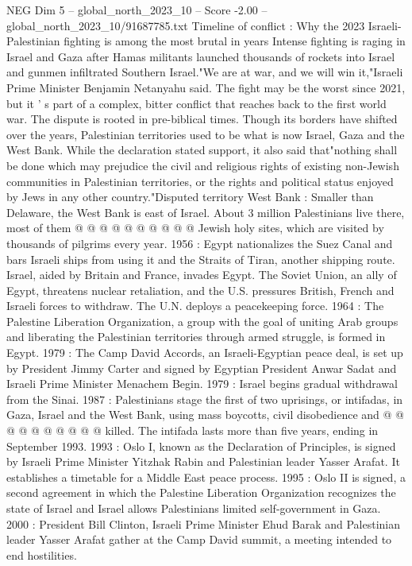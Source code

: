 \begin{textsample}{NEG Dim 5 – global\_north\_2023\_10 – Score -2.00 – global\_north\_2023\_10/91687785.txt}  \label{ex:f5_neg_021}
Timeline of conflict : Why the 2023 Israeli-Palestinian fighting is among the most brutal in years Intense fighting is raging in Israel and Gaza after Hamas militants launched thousands of rockets into Israel and gunmen infiltrated Southern Israel."We are at war, and we will win it,"Israeli Prime Minister Benjamin Netanyahu said.
The fight may be the worst since 2021, but it ' s part of a complex, bitter conflict that reaches back to the first world war.
The dispute is rooted in pre-biblical times.
Though its borders have shifted over the years, Palestinian territories used to be what is now Israel, Gaza and the West Bank.
While the declaration stated support, it also said that"nothing shall be done which may prejudice the civil and religious rights of existing non-Jewish communities in Palestinian territories, or the rights and political status enjoyed by Jews in any other country."Disputed territory West Bank : Smaller than Delaware, the West Bank is east of Israel.
About 3 million Palestinians live there, most of them @ @ @ @ @ @ @ @ @ @ Jewish holy sites, which are visited by thousands of pilgrims every year. 1956 : Egypt nationalizes the Suez Canal and bars Israeli ships from using it and the Straits of Tiran, another shipping route.
Israel, aided by Britain and France, invades Egypt.
The Soviet Union, an ally of Egypt, threatens nuclear retaliation, and the U.S. pressures British, French and Israeli forces to withdraw.
The U.N. deploys a peacekeeping force. 1964 : The Palestine Liberation Organization, a group with the goal of uniting Arab groups and liberating the Palestinian territories through armed struggle, is formed in Egypt. 1979 : The Camp David Accords, an Israeli-Egyptian peace deal, is set up by President Jimmy Carter and signed by Egyptian President Anwar Sadat and Israeli Prime Minister Menachem Begin. 1979 : Israel begins gradual withdrawal from the Sinai. 1987 : Palestinians stage the first of two uprisings, or intifadas, in Gaza, Israel and the West Bank, using mass boycotts, civil disobedience and @ @ @ @ @ @ @ @ @ @ killed.
The intifada lasts more than five years, ending in September 1993. 1993 : Oslo I, known as the Declaration of Principles, is signed by Israeli Prime Minister Yitzhak Rabin and Palestinian leader Yasser Arafat.
It establishes a timetable for a Middle East peace process. 1995 : Oslo II is signed, a second agreement in which the Palestine Liberation Organization recognizes the state of Israel and Israel allows Palestinians limited self-government in Gaza. 2000 : President Bill Clinton, Israeli Prime Minister Ehud Barak and Palestinian leader Yasser Arafat gather at the Camp David summit, a meeting intended to end hostilities.

\end{textsample}
